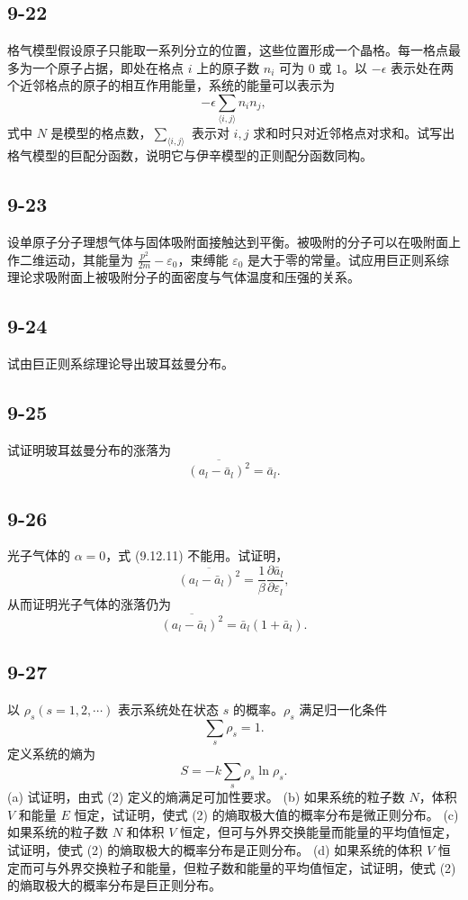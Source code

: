 \newpage
\subsection{9-22}
格气模型假设原子只能取一系列分立的位置，这些位置形成一个晶格。每一格点最多为一个原子占据，即处在格点 $i$ 上的原子数 $n_i$ 可为 $0$ 或 $1$。以 $-\epsilon$ 表示处在两个近邻格点的原子的相互作用能量，系统的能量可以表示为
$$ -\epsilon \sum_{\langle i,j \rangle} n_i n_j, $$
式中 $N$ 是模型的格点数，$\sum_{\langle i,j \rangle}$ 表示对 $i,j$ 求和时只对近邻格点对求和。试写出格气模型的巨配分函数，说明它与伊辛模型的正则配分函数同构。

\newpage
\subsection{9-23}
设单原子分子理想气体与固体吸附面接触达到平衡。被吸附的分子可以在吸附面上作二维运动，其能量为 $\frac{p^2}{2m} - \varepsilon_0$，束缚能 $\varepsilon_0$ 是大于零的常量。试应用巨正则系综理论求吸附面上被吸附分子的面密度与气体温度和压强的关系。

\newpage
\subsection{9-24}
试由巨正则系综理论导出玻耳兹曼分布。

\newpage
\subsection{9-25}
试证明玻耳兹曼分布的涨落为
$$ \overline{(a_l - \bar{a}_l)^2} = \bar{a}_l. $$

\newpage
\subsection{9-26}
光子气体的 $\alpha = 0$，式 (9.12.11) 不能用。试证明，
$$ \overline{(a_l - \bar{a}_l)^2} = \frac{1}{\beta} \frac{\partial \bar{a}_l}{\partial \varepsilon_l}, $$
从而证明光子气体的涨落仍为
$$ \overline{(a_l - \bar{a}_l)^2} = \bar{a}_l (1 + \bar{a}_l). $$

\newpage
\subsection{9-27}
以 $\rho_s (s=1,2,\cdots)$ 表示系统处在状态 $s$ 的概率。$\rho_s$ 满足归一化条件
$$ \sum_{s} \rho_s = 1. $$
定义系统的熵为
$$ S=-k \sum_{s} \rho_s \ln \rho_s. $$
(a) 试证明，由式 (2) 定义的熵满足可加性要求。
(b) 如果系统的粒子数 $N$，体积 $V$ 和能量 $E$ 恒定，试证明，使式 (2) 的熵取极大值的概率分布是微正则分布。
(c) 如果系统的粒子数 $N$ 和体积 $V$ 恒定，但可与外界交换能量而能量的平均值恒定，试证明，使式 (2) 的熵取极大的概率分布是正则分布。
(d) 如果系统的体积 $V$ 恒定而可与外界交换粒子和能量，但粒子数和能量的平均值恒定，试证明，使式 (2) 的熵取极大的概率分布是巨正则分布。

